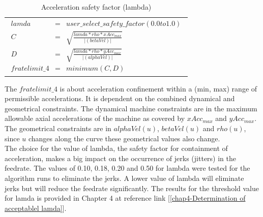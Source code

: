 \begin{table}[ht]
	\begin{center}
		\begin{tabular}{ p{14.0cm} }
			\caption{Acceleration safety factor (lambda)}
			\begin{eqnarray}
            lamda  & = & user\_select\_safety\_factor(0.0 to 1.0)     \nonumber \\
			C & = & \sqrt {\frac{lamda*rho*xAcc_{max}} { \Bigg |(betaVel) \Bigg |} } \nonumber \\
			D & = & \sqrt {\frac{lamda*rho*yAcc_{max}} { \Bigg |(alphaVel)\Bigg |} } \nonumber \\
			fratelimit\_4 & = & minimum (C, D) \nonumber
			\end{eqnarray}
		\end{tabular}
	\end{center}
\end{table}

The $fratelimit\_4$ is about acceleration confinement within a (min, max) range of permissible accelerations. It is dependent on the combined dynamical and geometrical constraints. The dynamical machine constraints are in the maximum allowable axial accelerations of the machine as covered by $xAcc_{max}$ and $yAcc_{max}$. The geometrical constraints are in $alphaVel(u)$, $betaVel(u)$ and $rho(u)$, since $u$ changes along the curve these geometrical values also change. \\

The choice for the value of lambda, the safety factor for containment of acceleration, makes a big impact on the occurrence of jerks (jitters) in the feedrate. The values of 0.10, 0.18, 0.20 and 0.50 for lambda were tested for the algorithm runs to eliminate the jerks. A lower value of lambda will eliminate jerks but will reduce the feedrate significantly. The results for the threshold value for lamda is provided in Chapter 4 at reference link [\ref{chap4-Determination of acceptablel lamda}].

\clearpage
\pagebreak


